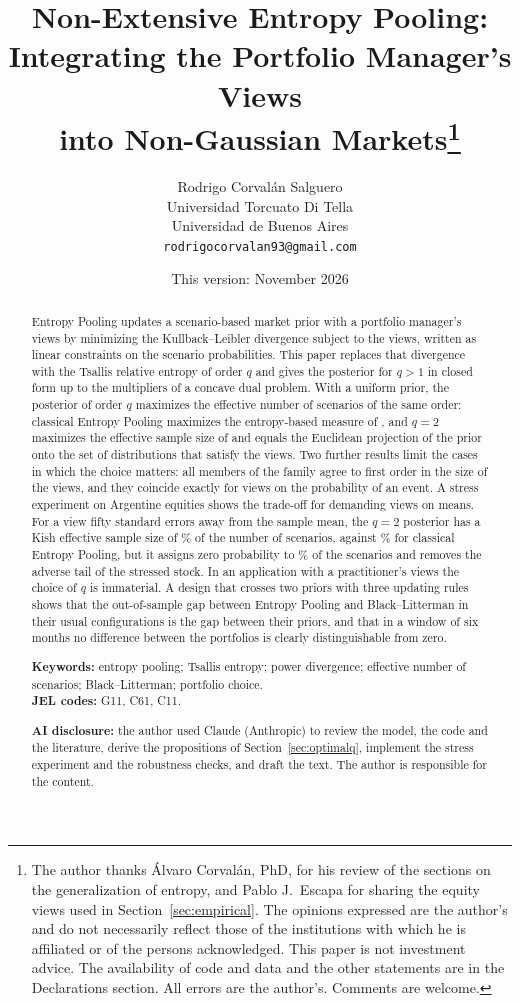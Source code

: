 \documentclass[11pt]{article}
\title{\textbf{Non-Extensive Entropy Pooling:\\ Integrating the Portfolio Manager's Views\\ into Non-Gaussian Markets}\thanks{The author thanks \'Alvaro Corval\'an, PhD, for his review of the sections on the generalization of entropy, and Pablo J.~Escapa for sharing the equity views used in Section~\ref{sec:empirical}. The opinions expressed are the author's and do not necessarily reflect those of the institutions with which he is affiliated or of the persons acknowledged. This paper is not investment advice. The availability of code and data and the other statements are in the Declarations section. All errors are the author's. Comments are welcome.}}
\author{Rodrigo Corval\'an Salguero\\ \small Universidad Torcuato Di Tella\\ \small Universidad de Buenos Aires\\ \small \texttt{rodrigocorvalan93@gmail.com}}
\date{This version: November 2026}
\begin{document}
\maketitle

\begin{abstract}
\noindent
Entropy Pooling \citep{Meucci2008} updates a scenario-based market prior
with a portfolio manager's views by minimizing the Kullback--Leibler
divergence subject to the views, written as linear constraints on the
scenario probabilities. This paper replaces that divergence with the Tsallis
relative entropy of order $q$ and gives the posterior for $q>1$ in closed form up to the multipliers of a
concave dual problem. With a uniform prior, the posterior of order $q$ maximizes the
effective number of scenarios of the same order: classical Entropy Pooling
maximizes the entropy-based measure of \citet{Meucci2012}, and $q=2$
maximizes the effective sample size of \citet{Kish1965} and equals the
Euclidean projection of the prior onto the set of distributions that satisfy
the views. Two further results limit the cases in which the choice matters: all members
of the family agree to first order in the size of the views, and they
coincide exactly for views on the probability of an event. A stress
experiment on Argentine equities shows the trade-off for demanding views on
means. For a view fifty standard errors away from the sample mean, the $q=2$
posterior has a Kish effective sample size of \nKishTFiftyPct\% of the
number of scenarios, against \nKishSFiftyPct\% for classical Entropy
Pooling, but it assigns zero probability
to \nZerosFiftyPct\% of the scenarios and removes the adverse tail of the
stressed stock. In an application with a practitioner's views the choice of
$q$ is immaterial. A design that crosses two priors with three updating
rules shows that the out-of-sample gap between Entropy Pooling and
Black--Litterman in their usual configurations is the gap between their
priors, and that in a window of six months no difference between the
portfolios is clearly distinguishable from zero.
\medskip

\noindent\textbf{Keywords:} entropy pooling; Tsallis entropy; power
divergence; effective number of scenarios; Black--Litterman; portfolio
choice.\\
\textbf{JEL codes:} G11, C61, C11.
\medskip

\noindent\textbf{AI disclosure:} the author used Claude (Anthropic) to
review the model, the code and the literature, derive the propositions of
Section~\ref{sec:optimalq}, implement the stress experiment and the
robustness checks, and draft the text. The author is responsible for the
content.
\end{abstract}
\end{document}

